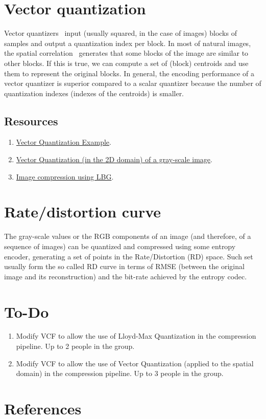 \section{Vector quantization}

Vector quantizers~\cite{vruiz__vector_quantization} input (usually
squared, in the case of images) blocks of samples and output a
quantization index per block. In most of natural images, the spatial
correlation~\cite{vruiz__visual_redundancy} generates that some blocks
of the image are similar to other blocks. If this is true, we can
compute a set of (block) centroids and use them to represent the
original blocks. In general, the encoding performance of a vector
quantizer is superior compared to a scalar quantizer because the
number of quantization indexes (indexes of the centroids) is smaller.

\subsection*{Resources}

\begin{enumerate}
\item \href{https://scikit-learn.org/stable/auto_examples/cluster/plot_face_compress.html#sphx-glr-auto-examples-cluster-plot-face-compress-py}{Vector Quantization Example}.
\item
  \href{https://github.com/Sistemas-Multimedia/Sistemas-Multimedia.github.io/blob/master/contents/gray_VQ/gray_VQ.ipynb}{Vector
    Quantization (in the 2D domain) of a gray-scale image}.
\item \href{https://github.com/vicente-gonzalez-ruiz/image_vector_quantization_LBG}{Image compression using LBG}.
\end{enumerate}

\section{Rate/distortion curve}

The gray-scale values or the $\text{RGB}$ components of an image (and
therefore, of a sequence of images) can be quantized and compressed
using some entropy encoder, generating a set of points in the
Rate/Distortion (RD) space. Such set usually form the so called RD
curve in terms of RMSE (between the original image and its
reconstruction) and the bit-rate achieved by the entropy codec.

\section{To-Do}
\begin{enumerate}
\item Modify VCF to allow the use of Lloyd-Max Quantization in the
  compression pipeline. Up to 2 people in the group.
\item Modify VCF to allow the use of Vector Quantization (applied to
  the spatial domain) in the compression pipeline. Up to 3 people in
  the group.
\end{enumerate}

\section{References}

\renewcommand{\addcontentsline}[3]{}%

